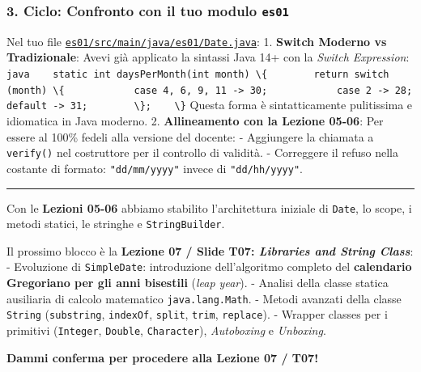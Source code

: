 \documentclass[11pt,a4paper]{article}
\newcommand{\passthrough}[1]{#1}
\begin{document}
\subsubsection{\texorpdfstring{3. Ciclo: Confronto con il tuo modulo
\texttt{es01}}{3. Ciclo: Confronto con il tuo modulo es01}}\label{ciclo-confronto-con-il-tuo-modulo-es01}

Nel tuo file
\href{file:///home/wally/Documenti/GitHub/Programmazione-II/25-26/esercizi-wally-25-26/es01/src/main/java/es01/Date.java}{\passthrough{\lstinline!es01/src/main/java/es01/Date.java!}}:
1. \textbf{Switch Moderno vs Tradizionale}: Avevi già applicato la
sintassi Java 14+ con la \emph{Switch Expression}:
\passthrough{\lstinline!java    static int daysPerMonth(int month) \{        return switch (month) \{            case 4, 6, 9, 11 -> 30;            case 2 -> 28;            default -> 31;        \};    \}!}
Questa forma è sintatticamente pulitissima e idiomatica in Java moderno.
2. \textbf{Allineamento con la Lezione 05-06}: Per essere al 100\%
fedeli alla versione del docente: - Aggiungere la chiamata a
\passthrough{\lstinline!verify()!} nel costruttore per il controllo di
validità. - Correggere il refuso nella costante di formato:
\passthrough{\lstinline!"dd/mm/yyyy"!} invece di
\passthrough{\lstinline!"dd/hh/yyyy"!}.

\begin{center}\rule{0.5\linewidth}{0.5pt}\end{center}

\begin{studynote} Con le \textbf{Lezioni 05-06} abbiamo stabilito
l'architettura iniziale di \passthrough{\lstinline!Date!}, lo scope, i
metodi statici, le stringhe e \passthrough{\lstinline!StringBuilder!}.

Il prossimo blocco è la \textbf{Lezione 07 / Slide T07: \emph{Libraries
and String Class}}: - Evoluzione di
\passthrough{\lstinline!SimpleDate!}: introduzione dell'algoritmo
completo del \textbf{calendario Gregoriano per gli anni bisestili}
(\emph{leap year}). - Analisi della classe statica ausiliaria di calcolo
matematico \passthrough{\lstinline!java.lang.Math!}. - Metodi avanzati
della classe \passthrough{\lstinline!String!}
(\passthrough{\lstinline!substring!}, \passthrough{\lstinline!indexOf!},
\passthrough{\lstinline!split!}, \passthrough{\lstinline!trim!},
\passthrough{\lstinline!replace!}). - Wrapper classes per i primitivi
(\passthrough{\lstinline!Integer!}, \passthrough{\lstinline!Double!},
\passthrough{\lstinline!Character!}), \emph{Autoboxing} e
\emph{Unboxing}.
\end{studynote}

\textbf{Dammi conferma per procedere alla Lezione 07 / T07!}
\end{document}
